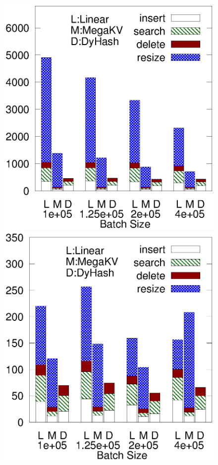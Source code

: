 \begin{figure}[ht]
\begin{minipage}{0.19\linewidth}
		\centerline{\dsreddit}
	\end{minipage}
	\begin{minipage}{0.19\linewidth}\centering
		\includegraphics[width=\linewidth]{pic/dynamic/tpch/diff_batch_size.eps}
		\centerline{\dstpch}
	\end{minipage}
	\begin{minipage}{0.19\linewidth}\centering
		\includegraphics[width=\linewidth]{pic/dynamic/ali/diff_batch_size.eps}

\end{minipage}
\end{figure}
